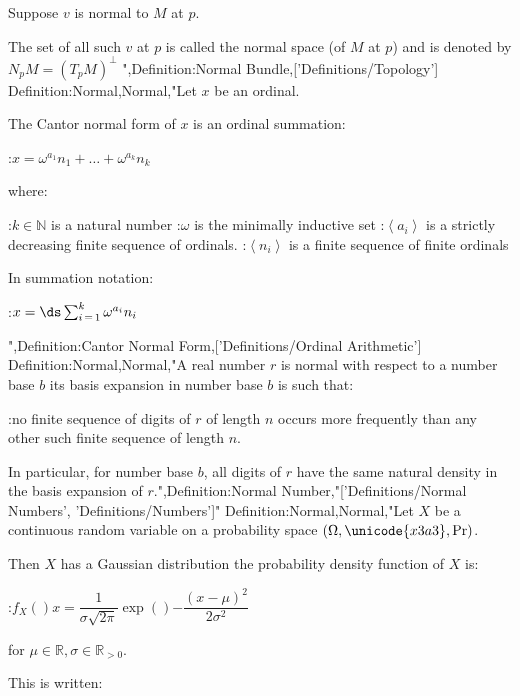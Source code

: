 Suppose $v$ is normal to $M$ at $p$.


The set of all such $v$ at $p$ is called the normal space (of $M$ at $p$) and is denoted by $N_p M = \left( T_p M \right)^\perp$
",Definition:Normal Bundle,['Definitions/Topology']
Definition:Normal,Normal,"Let $x$ be an ordinal.


The Cantor normal form of $x$ is an ordinal summation:

:$x = \omega^{a_1} n_1 + \dots + \omega^{a_k} n_k$

where:

:$k \in \mathbb N$ is a natural number
:$\omega$ is the minimally inductive set
:$\left\langle a_i \right\rangle$ is a strictly decreasing finite sequence of ordinals.
:$\left\langle n_i \right\rangle$ is a finite sequence of finite ordinals


In summation notation:

:$x = \ds \sum_{i \mathop = 1}^k \omega^{a_i} n_i$

",Definition:Cantor Normal Form,['Definitions/Ordinal Arithmetic']
Definition:Normal,Normal,"A real number $r$ is normal with respect to a number base $b$  its basis expansion in number base $b$ is such that:

:no finite sequence of digits of $r$ of length $n$ occurs more frequently than any other such finite sequence of length $n$.


In particular, for number base $b$, all digits of $r$ have the same natural density in the basis expansion of $r$.",Definition:Normal Number,"['Definitions/Normal Numbers', 'Definitions/Numbers']"
Definition:Normal,Normal,"Let $X$ be a continuous random variable on a probability space $\left( \Omega, \unicode{x3a3}, \Pr \right)$.


Then $X$ has a Gaussian distribution  the probability density function of $X$ is:

:$f_X \left(   \right)x = \dfrac 1 {\sigma \sqrt {2 \pi} } \exp \left(   \right){-\dfrac {\left( x - \mu \right)^2} {2 \sigma^2} }$

for $\mu \in \mathbb R, \sigma \in \mathbb R_{> 0}$.


This is written: 


